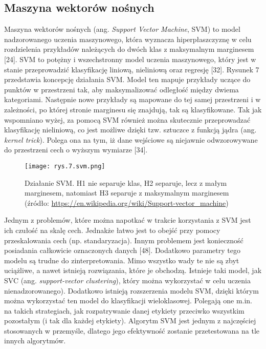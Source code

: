 \subsection{Maszyna wektorów nośnych}
\label{cha:Maszyna wektorów nośnych}

Maszyna wektorów nośnych (ang. \textit{Support Vector Machine}, SVM) to model nadzorowanego uczenia maszynowego, która wyznacza hiperpłaszczyznę w celu rozdzielenia przykładów należących do dwóch klas z maksymalnym marginesem [24]. SVM to potężny i wszechstronny model uczenia maszynowego, który jest w stanie przeprowadzić klasyfikację liniową, nieliniową oraz regresję [32]. Rysunek 7 przedstawia koncepcję działania SVM. Model ten mapuje przykłady uczące do punktów w przestrzeni tak, aby maksymalizować odległość między dwiema kategoriami. Następnie nowe przykłady są mapowane do tej samej przestrzeni i w zależności, po której stronie marginesu się znajdują, tak są klasyfikowane. Tak jak wspomniano wyżej, za pomocą SVM również można skutecznie przeprowadzać klasyfikację nieliniową, co jest możliwe dzięki tzw. sztuczce z funkcją jądra (ang. \textit{kernel trick}). Polega ona na tym, iż dane wejściowe są niejawnie odwzorowywane do przestrzeni cech o wyższym wymiarze [34]. 

\begin{figure}[h]
    \centering
    \texttt{[image: rys.7.svm.png]}
    \caption{Działanie SVM. H1 nie separuje klas, H2 separuje, lecz z małym marginesem, natomiast H3 separuje z maksymalnym marginesem \protect\linebreak 
		(źródło: \protect\href{https://en.wikipedia.org/wiki/Support-vector_machine}{https://en.wikipedia.org/wiki/Support-vector\_machine})}
    \label{fig:mesh7}
\end{figure}
\noindent Jednym z problemów, które można napotkać w trakcie korzystania z SVM jest ich czułość na skalę cech. Jednakże łatwo jest to obejść przy pomocy przeskalowania cech (np. standaryzacja). Innym problemem jest konieczność posiadania całkowicie oznaczonych danych [48]. Dodatkowo parametry tego modelu są trudne do zinterpretowania. Mimo wszystko wady te nie są zbyt uciążliwe, a nawet istnieją rozwiązania, które je obchodzą. Istnieje taki model, jak SVC (ang. \textit{support-vector clustering}), który można wykorzystać w celu uczenia nienadzorowanego). Dodatkowo istnieją rozszerzenia modelu SVM, dzięki którym można wykorzystać ten model do klasyfikacji wieloklasowej. Polegają one m.in. na takich strategiach, jak rozpatrywanie danej etykiety przeciwko wszystkim pozostałym (i tak dla każdej etykiety). Algorytm SVM jest jednym z najczęściej stosowanych w przemyśle, dlatego jego efektywność zostanie przetestowana na tle innych algorytmów.

